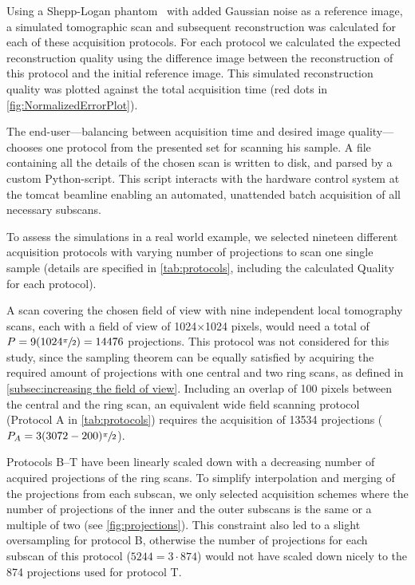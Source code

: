 Using a Shepp-Logan phantom~\cite{Shepp1974} with added Gaussian noise as a reference image, a simulated tomographic scan and subsequent reconstruction was calculated for each of these acquisition protocols. For each protocol we calculated the expected reconstruction quality using the difference image between the reconstruction of this protocol and the initial reference image. This simulated reconstruction quality was plotted against the total acquisition time (red dots in \autoref{fig:NormalizedErrorPlot}).

The end-user---balancing between acquisition time and desired image quality---chooses one protocol from the presented set for scanning his sample. A file containing all the details of the chosen scan is written to disk, and parsed by a custom Python-script. This script interacts with the hardware control system at the \ac{tomcat} beamline enabling an automated, unattended batch acquisition of all necessary subscans.

To assess the simulations in a real world example, we selected nineteen different acquisition protocols with varying number of projections to scan one single sample (details are specified in \autoref{tab:protocols}, including the calculated Quality for each protocol).

A scan covering the chosen field of view with nine independent local tomography scans, each with a field of view of 1024$\times$1024 pixels, would need a total of $P=9(1024\sfrac{\pi}{2})=14476$ projections. This protocol was not considered for this study, since the sampling theorem can be equally satisfied by acquiring the required amount of projections with one central and two ring scans, as defined in \autoref{subsec:increasing the field of view}. Including an overlap of 100 pixels between the central and the ring scan, an equivalent wide field scanning protocol (Protocol A in \autoref{tab:protocols}) requires the acquisition of 13534 projections ($P_{A}=3(3072-200)\sfrac{\pi}{2}$).

Protocols B--T have been linearly scaled down with a decreasing number of acquired projections of the ring scans. To simplify interpolation and merging of the projections from each subscan, we only selected acquisition schemes where the number of projections of the inner and the outer subscans is the same or a multiple of two (see \autoref{fig:projections}). This constraint also led to a slight oversampling for protocol B, otherwise the number of projections for each subscan of this protocol ($5244=3\cdot874$) would not have scaled down nicely to the 874 projections used for protocol T.

